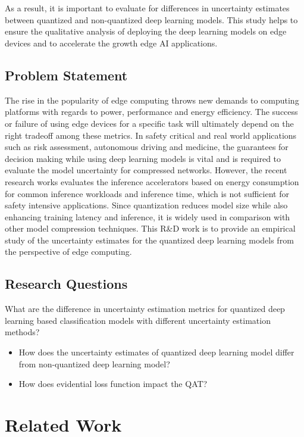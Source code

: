 \documentclass[rnd]{mas_proposal}
\begin{document}
\\\\
As a result, it is important to evaluate for differences in uncertainty estimates between quantized and non-quantized deep learning models. This study helps to ensure the qualitative analysis of deploying the deep learning models on edge devices and to accelerate the growth edge AI applications. 

\subsection{Problem Statement}
The rise in the popularity of edge computing throws new demands to computing platforms with regards to power, performance and energy efficiency. The success or failure of using edge devices for a specific task will ultimately depend on the right tradeoff among these metrics. In safety critical and real world applications such as risk assessment\cite{mackay1995bayesian}, autonomous driving\cite{mcallister2017concrete} and medicine\cite{liang2018bayesian}, the guarantees for decision making while using deep learning models is vital and is required to evaluate the model uncertainty for compressed networks. However, the recent research works evaluates the inference accelerators based on energy consumption for common inference workloads and inference time, which is not sufficient for safety intensive applications. Since quantization reduces model size while also enhancing training latency and inference, it is widely used in comparison with other model compression techniques\cite{rodriguez2018lower}. This R\&D work is to provide an empirical study of the uncertainty estimates for the quantized deep learning models from the perspective of edge computing.

\subsection{Research Questions}
What are the difference in uncertainty estimation metrics for quantized deep learning based classification models with different uncertainty estimation methods?
\begin{itemize}
    \item How does the uncertainty estimates of quantized deep learning model differ from non-quantized deep learning model?
    \item How does evidential loss function impact the QAT?
\end{itemize}


\section{Related Work}
\end{document}
